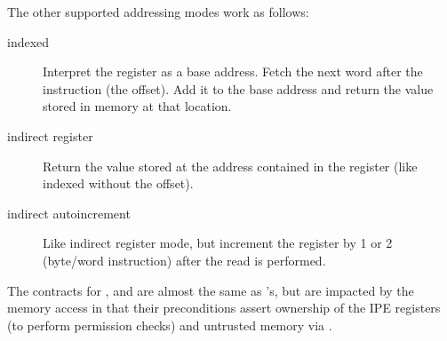The other supported addressing modes work as follows:
\begin{description}
\item[indexed] Interpret the register as a base address. Fetch the next word after the instruction (the offset). Add it to the base address and return the value stored in memory at that location.
\item[indirect register] Return the value stored at the address contained in the register (like indexed without the offset).
\item[indirect autoincrement] Like indirect register mode, but increment the register by 1 or 2 (byte/word instruction) after the read is performed.
\end{description}
The contracts for ,  and  are almost the same as 's, but are impacted by the memory access in that their preconditions assert ownership of the IPE registers (to perform permission checks) and untrusted memory via .


